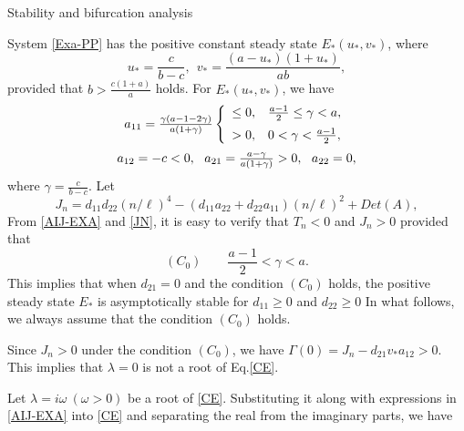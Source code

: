\documentclass[11pt]{article}
\theoremstyle{definition}
\theoremstyle{remark}
\numberwithin{equation}{section}
\begin{document}
\begin{subsection}
   {Stability and bifurcation analysis}
 \end{subsection}



System \eqref{Exa-PP} has the  positive constant steady state $E_*(u_*, v_*)$, where
$$u_*=\frac{c}{b-c},~~v_*=\frac{(a-u_*)(1+u_*)}{ab},$$
provided that $b>\frac{c(1+a)}{a}$ holds.  For  $E_*(u_*, v_*)$,  we have
\begin{equation}
\label{AIJ-EXA}
\begin{array}{c}
a_{11}=\frac{\gamma(a-1-2\gamma)}{a(1+\gamma)}
\left\{\begin{array}{ll}
\leq 0, & \frac{a-1}{2}\leq \gamma< a,\vspace{0.2cm}\\
>0, & 0<\gamma<\frac{a-1}{2},
\end{array}\right.
 \vspace{0.2cm}\\
 a_{12}=-c<0, ~~a_{21}=\frac{a-\gamma}{a(1+\gamma)}>0,   ~~a_{22}=0,
\end{array}
\end{equation}
where $\gamma=\frac{c}{b-c}$.
Let
\begin{equation}
\label{JN}
J_n=d_{11}d_{22} (n/\ell)^4
-\left(d_{11}a_{22}+d_{22}a_{11}\right) (n/\ell)^2+Det(A),
\end{equation}
From \eqref{AIJ-EXA} and \eqref{JN}, it is easy to verify that $T_n<0$ and $J_n>0$  provided that
$$(C_0)\quad \quad \frac{a-1}{2}< \gamma< a.$$
This implies that   when $d_{21}=0$ and the condition $(C_0)$ holds,  the  positive steady state $E_*$ is asymptotically  stable for   $d_{11}\geq 0$ and $d_{22}\geq 0$
 In what follows, we always assume that the condition $(C_0)$ holds.

  Since $J_n>0 $ under the condition $(C_0)$, we have  $\Gamma(0)=J_n-d_{21}v_*a_{12}>0$.    This implies that $\lambda=0$ is not a root of Eq.\eqref{CE}.

Let  $\lambda=i \omega~(\omega>0)$ be a root of \eqref{CE}.  Substituting it  along with expressions in \eqref{AIJ-EXA} into \eqref{CE} and separating the real from the imaginary parts, we have
\end{document}
